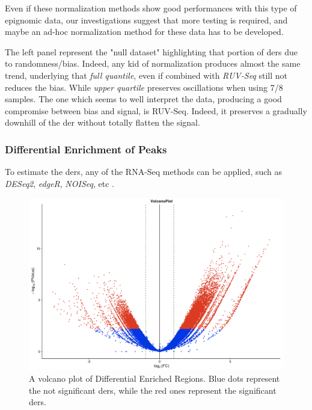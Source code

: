 Even if these normalization methods show good performances with this type of epignomic data, our investigations suggest that more testing is required, and maybe an ad-hoc normalization method for these data has to be developed.

The left panel represent the "null dataset" highlighting that portion of \glspl{der} due to randomness/bias. Indeed, any kid of normalization produces almost the same trend, underlying that \textit{full quantile}, even if combined with \textit{RUV-Seq} still not reduces the bias.
While \textit{upper quartile} preserves oscillations when using 7/8 samples.
The one which seems to well interpret the data, producing a good compromise between bias and signal, is RUV-Seq.
Indeed, it preserves a gradually downhill of the \gls{der} without totally flatten the signal.

\subsubsection{Differential Enrichment of Peaks}

To estimate the \glspl{der}, any of the RNA-Seq methods can be applied, such as \textit{DESeq2}, \textit{edgeR}, \textit{NOISeq}, etc \cite{Robinson2009, McCarthy2012, Tarazona2012}.

\begin{figure}[H]
\centering
\includegraphics[width=\textwidth, height=\textheight, keepaspectratio]{img/descan2/DE_peaks.png}
\caption[Differential Enrichment Regions Volcano]{A volcano plot of Differential Enriched Regions. Blue dots represent the not significant \glspl{der}, while the red ones represent the significant \glspl{der}.}
\label{fig:depeaksdescan}
\centering
\end{figure}

